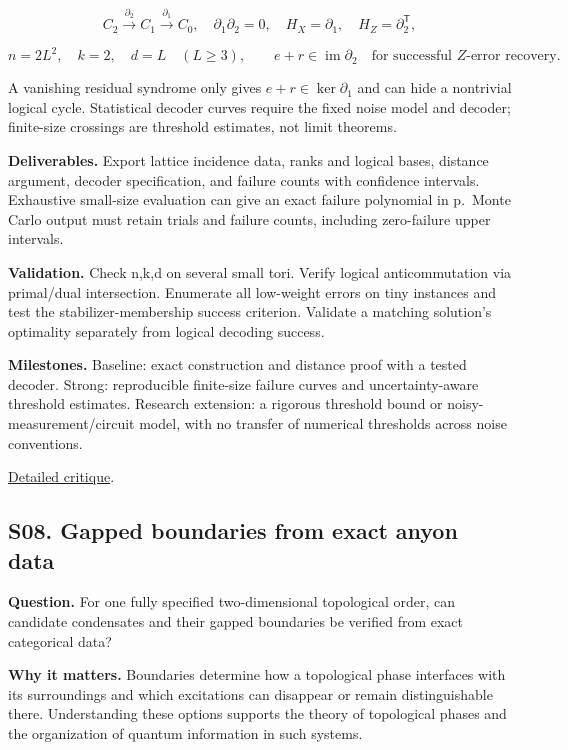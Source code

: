 \documentclass[
  11pt,
]{article}
\begin{document}
\[C_2\xrightarrow{\partial_2}C_1\xrightarrow{\partial_1}C_0,
\quad\partial_1\partial_2=0,\quad H_X=\partial_1,\quad H_Z=\partial_2^{\mathsf T},\]

\[n=2L^2,\quad k=2,\quad d=L\quad(L\ge3),\qquad
e+r\in\operatorname{im}\partial_2\quad\text{for successful }Z\text{-error recovery}.\]

A vanishing residual syndrome only gives \(e+r\in\ker\partial_1\) and
can hide a nontrivial logical cycle. Statistical decoder curves require
the fixed noise model and decoder; finite-size crossings are threshold
estimates, not limit theorems.

\textbf{Deliverables.} Export lattice incidence data, ranks and logical
bases, distance argument, decoder specification, and failure counts with
confidence intervals. Exhaustive small-size evaluation can give an exact
failure polynomial in p.~Monte Carlo output must retain trials and
failure counts, including zero-failure upper intervals.

\textbf{Validation.} Check n,k,d on several small tori. Verify logical
anticommutation via primal/dual intersection. Enumerate all low-weight
errors on tiny instances and test the stabilizer-membership success
criterion. Validate a matching solution's optimality separately from
logical decoding success.

\textbf{Milestones.} Baseline: exact construction and distance proof
with a tested decoder. Strong: reproducible finite-size failure curves
and uncertainty-aware threshold estimates. Research extension: a
rigorous threshold bound or noisy-measurement/circuit model, with no
transfer of numerical thresholds across noise conventions.

\href{https://github.com/rick-stevens-ai/Pure-Thought/blob/main/reviews/24-Topological-Quantum-Error-Correction.md}{Detailed
critique}.

\subsection{S08. Gapped boundaries from exact anyon data}

\textbf{Question.} For one fully specified two-dimensional topological
order, can candidate condensates and their gapped boundaries be verified
from exact categorical data?

\textbf{Why it matters.} Boundaries determine how a topological phase
interfaces with its surroundings and which excitations can disappear or
remain distinguishable there. Understanding these options supports the
theory of topological phases and the organization of quantum information
in such systems.
\end{document}
